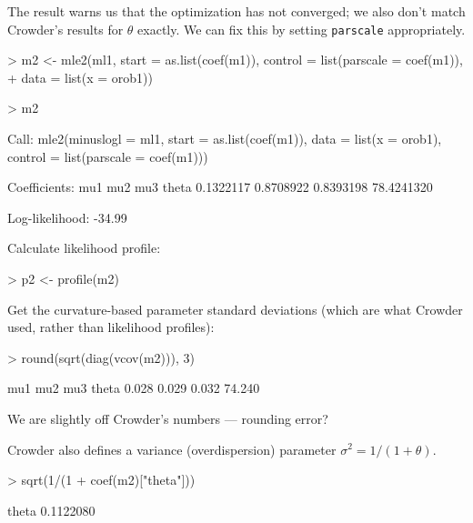 \documentclass{article}
\newcommand{\code}[1]{{\tt #1}}
\begin{document}
The result warns us that the optimization has not
converged; we also don't match
Crowder's results for $\theta$ exactly.
We can fix this by setting \code{parscale} appropriately.

\begin{Schunk}
\begin{Sinput}
> m2 <- mle2(ml1, start = as.list(coef(m1)), control = list(parscale = coef(m1)), 
+     data = list(x = orob1))
\end{Sinput}
\end{Schunk}

\begin{Schunk}
\begin{Sinput}
> m2
\end{Sinput}
\begin{Soutput}
Call:
mle2(minuslogl = ml1, start = as.list(coef(m1)), data = list(x = orob1), 
    control = list(parscale = coef(m1)))

Coefficients:
       mu1        mu2        mu3      theta 
 0.1322117  0.8708922  0.8393198 78.4241320 

Log-likelihood: -34.99 
\end{Soutput}
\end{Schunk}

Calculate likelihood profile:
\begin{Schunk}
\begin{Sinput}
> p2 <- profile(m2)
\end{Sinput}
\end{Schunk}

Get the curvature-based parameter standard
deviations (which are what Crowder used,
rather than likelihood profiles):
\begin{Schunk}
\begin{Sinput}
> round(sqrt(diag(vcov(m2))), 3)
\end{Sinput}
\begin{Soutput}
   mu1    mu2    mu3  theta 
 0.028  0.029  0.032 74.240 
\end{Soutput}
\end{Schunk}
We are slightly off Crowder's numbers --- rounding
error?

Crowder also defines a variance (overdispersion) parameter
$\sigma^2=1/(1+\theta)$.
\begin{Schunk}
\begin{Sinput}
> sqrt(1/(1 + coef(m2)["theta"]))
\end{Sinput}
\begin{Soutput}
    theta 
0.1122080 
\end{Soutput}
\end{Schunk}
\end{document}
